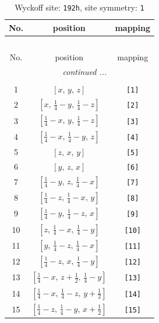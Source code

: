 \documentclass[fleqn,8pt]{jsarticle}
\begin{document}
\begin{longtable}{ccc}
\caption{Wyckoff site: {\tt 192h}, site symmetry: {\tt 1}}
 \\
 \hline \hline
No. & position & mapping \\ \hline \endfirsthead

\multicolumn{2}{l}{\tablename\ \thetable{}} \\
 \hline \hline
No. & position & mapping \\ \hline \endhead

 \hline \hline
\multicolumn{2}{r}{\footnotesize\it continued ...} \\ \endfoot

 \hline \hline
\multicolumn{2}{r}{} \\ \endlastfoot

1 & $\left[ x,\, y,\, z \right]$ & {\tt [1]} \\ \hline
2 & $\left[ x,\, \frac{1}{4} - y,\, \frac{1}{4} - z \right]$ & {\tt [2]} \\ \hline
3 & $\left[ \frac{1}{4} - x,\, y,\, \frac{1}{4} - z \right]$ & {\tt [3]} \\ \hline
4 & $\left[ \frac{1}{4} - x,\, \frac{1}{4} - y,\, z \right]$ & {\tt [4]} \\ \hline
5 & $\left[ z,\, x,\, y \right]$ & {\tt [5]} \\ \hline
6 & $\left[ y,\, z,\, x \right]$ & {\tt [6]} \\ \hline
7 & $\left[ \frac{1}{4} - y,\, z,\, \frac{1}{4} - x \right]$ & {\tt [7]} \\ \hline
8 & $\left[ \frac{1}{4} - z,\, \frac{1}{4} - x,\, y \right]$ & {\tt [8]} \\ \hline
9 & $\left[ \frac{1}{4} - y,\, \frac{1}{4} - z,\, x \right]$ & {\tt [9]} \\ \hline
10 & $\left[ z,\, \frac{1}{4} - x,\, \frac{1}{4} - y \right]$ & {\tt [10]} \\ \hline
11 & $\left[ y,\, \frac{1}{4} - z,\, \frac{1}{4} - x \right]$ & {\tt [11]} \\ \hline
12 & $\left[ \frac{1}{4} - z,\, x,\, \frac{1}{4} - y \right]$ & {\tt [12]} \\ \hline
13 & $\left[ \frac{1}{4} - x,\, z + \frac{1}{2},\, \frac{1}{4} - y \right]$ & {\tt [13]} \\ \hline
14 & $\left[ \frac{1}{4} - x,\, \frac{1}{4} - z,\, y + \frac{1}{2} \right]$ & {\tt [14]} \\ \hline
15 & $\left[ \frac{1}{4} - z,\, \frac{1}{4} - y,\, x + \frac{1}{2} \right]$ & {\tt [15]} \\ \hline

\end{longtable}
\end{document}
